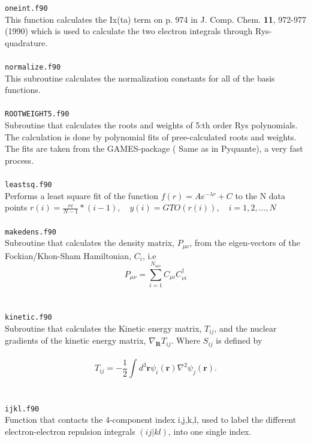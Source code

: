 \documentclass[a4paper,twoside,openany]{book}
\begin{document}
{{\texttt{oneint.f90}\\
This function calculates the Ix(ta) term on p. 974 in J. Comp. Chem. {\bf 11}, 972-977 (1990)
which is used to calculate the two electron integrals through Rys-quadrature. \\ \\
\texttt{normalize.f90}\\
This subroutine calculates the normalization constants 
for all of the basis functions. \\ \\
\texttt{ROOTWEIGHT5.f90}\\
Subroutine that calculates the roots and weights of 5:th order Rys polynomials. The calculation is done by 
polynomial fits of pree-calculated roots and weights. The fits are taken from the GAMES-package ( Same as in Pyquante), a very fast process. \\ \\
\texttt{leastsq.f90}\\
Performs a least square fit of the function 
$f(r) = Ae^{-\lambda r} + C$ to the N data points
$r(i) = \frac{rc}{N-1}*(i-1),\quad y(i) = GTO(r(i)),\quad i=1,2,\ldots,N$ \\ \\
\texttt{makedens.f90}\\
Subroutine that calculates the density matrix, $P_{\mu \nu}$, from the eigen-vectors of the Fockian/Khon-Sham Hamiltonian, $C_{i}$, i.e
\begin{equation}
P_{\mu \nu}= \sum_{i=1}^{N_{occ}}C_{\mu i}C_{\nu i}^{\dagger} \nonumber
\end{equation}\\ \\
\texttt{kinetic.f90}\\
Subroutine that calculates the Kinetic energy matrix, $T_{ij}$, and the nuclear gradients of the kinetic energy matrix, $\nabla_{\mathbf{R}}T_{ij}$. Where $S_{ij}$ is defined by \\ \\
\begin{equation}
T_{ij} = -\frac{1}{2}\int d^{3}\mathbf{r}\psi_{i}( \mathbf{r} )\nabla^{2}\psi_{j}( \mathbf{r} ). \nonumber
\end{equation}
\\ \\
\texttt{ijkl.f90}\\
Function that contacts the 4-component index i,j,k,l, used to label the different electron-electron repulsion integrals  $(ij|kl)$, into one single index.\\ \\
}}
\end{document}
